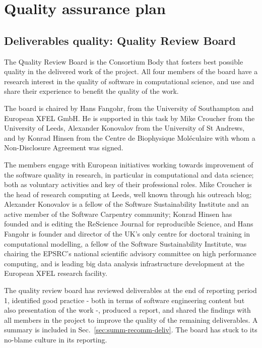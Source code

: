 \section{Quality assurance plan}

\subsection{Deliverables quality: Quality Review Board}

The Quality Review Board is the Consortium Body that fosters best
possible quality in the delivered work of the project.
All four members of the board
have a research interest in the quality of software in computational
science, and use and share their experience to benefit the quality of
the work.

The board is chaired by Hans Fangohr, from the University of
Southampton and European XFEL GmbH. He is supported in this task by
Mike Croucher from the University of Leeds, Alexander Konovalov from
the University of St Andrews, and by Konrad Hinsen from the Centre de
Biophysique Moléculaire with whom a Non-Disclosure Agreement was
signed.

The members engage with European initiatives working towards
improvement of the software quality in research, in particular in
computational and data science; both as voluntary activities and key
of their professional roles. Mike Croucher is the head of research
computing at Leeds, well known through his outreach blog; Alexander Konovalov
is a fellow of the Software Sustainability Institute and an active
member of the Software Carpentry community; Konrad Hinsen has
founded and is editing the ReScience Journal for reproducible Science,
and Hans Fangohr is founder and director of the UK's only centre for
doctoral training in computational modelling, a fellow of the Software
Sustainability Institute, was chairing the EPSRC's national scientific
advisory committee on high performance computing, and is leading big
data analysis infrastructure development at the European XFEL research
facility.

The quality review board has reviewed deliverables at the end of
reporting period 1, identified good practice - both in terms of
software engineering content but also presentation of the work -,
produced a report, and shared the findings with all members in the
project to improve the quality of the remaining deliverables. A
summary is included in Sec.~\ref{sec:summ-recomm-deliv}. The
board has stuck to its no-blame culture in its reporting.

